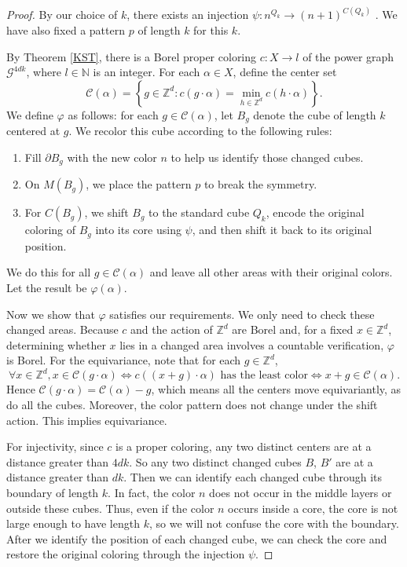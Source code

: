 \documentclass[11pt, reqno, a4paper]{amsart}
\theoremstyle{plain}
\theoremstyle{definition}
\theoremstyle{remark}
\begin{document}
\begin{proof}
By our choice of $k$, there exists an injection $\psi: n^{Q_k} \longrightarrow (n+1)^{C(Q_k)}$ . We have also fixed a pattern $p$ of length $k$ for this $k$.

By Theorem \ref{KST}, there is a Borel proper coloring $c:X\longrightarrow l$ of the power graph $\mathcal{G}^{4dk}$, where $l\in\mathbb{N}$ is an integer. For each $\alpha\in X$, define the center set
\[
\mathcal{C}(\alpha)=\left\{g\in\mathbb{Z}^d:c(g\cdot\alpha)=\min_{h\in\mathbb{Z}^d}c(h\cdot\alpha)\right\}.
\]
We define $\varphi$ as follows: for each $g\in \mathcal{C}(\alpha)$, let $B_g$ denote the cube of length $k$ centered at $g$. We recolor this cube according to the following rules:
\begin{enumerate}
    \item Fill $\partial B_g$ with the new color $n$ to help us identify those changed cubes.
    \item On $M(B_g)$, we place the pattern $p$ to break the symmetry.
    \item For $C(B_g)$, we shift $B_g$ to the standard cube $Q_k$, encode the original coloring of $B_g$ into its core using $\psi$,
and then shift it back to its original position.
\end{enumerate}

We do this for all $g\in \mathcal{C}(\alpha)$ and leave all other areas with their original colors. Let the result be $\varphi(\alpha)$. 

Now we show that $\varphi$ satisfies our requirements. We only need to check these changed areas. Because $c$ and the action of ${\mathbb{Z}}^d$ are Borel and, for a fixed $x\in \mathbb{Z}^d$, determining whether $x$ lies in a changed area involves a countable verification, $\varphi$ is Borel. For the equivariance, note that for each $g\in\mathbb{Z}^d$, 
\[\forall x\in {\mathbb{Z}}^d, x\in \mathcal{C}(g\cdot\alpha)\iff c((x+g)\cdot\alpha)\text{ has the least color}\iff x+g\in \mathcal{C}(\alpha).\]
 Hence $\mathcal{C}(g\cdot\alpha)=\mathcal{C}(\alpha)-g$, which means all the centers move equivariantly, as do all the cubes. Moreover, the color pattern does not change under the shift action. This implies equivariance.

 For injectivity, since $c$ is a proper coloring, any two distinct centers are at a distance greater than $4dk$. So any two distinct changed cubes $B$, $B'$ are at a distance greater than $dk$. Then we can identify each changed cube through its boundary of length $k$. In fact, the color $n$ does not occur in the middle layers or outside these cubes. Thus, even if the color $n$ occurs inside a core, the core is not large enough to have length $k$, so we will not confuse the core with the boundary. After we identify the position of each changed cube,  we can check the core and restore the original coloring through the injection $\psi$.
 

\end{proof}
\end{document}
